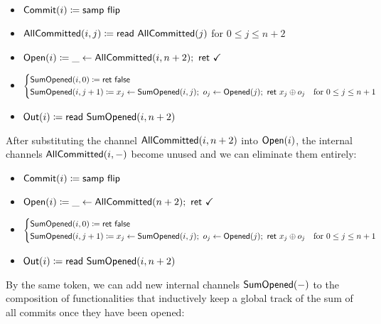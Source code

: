 \begin{itemize}
\item {\color{blue} $\mathsf{Commit}(i) \coloneqq \mathsf{samp} \ \mathsf{flip}$}
\item {\color{magenta} $\mathsf{AllCommitted}(i,j) \coloneqq \mathsf{read} \ \mathsf{AllCommitted}(j)$ for $0 \leq j \leq n+2$}
\item {\color{teal} $\Open(i) \coloneqq \_ \leftarrow \AllCommitted(i,n+2); \ \ret{\checkmark}$}
\item {\color{red} $\begin{cases*} \SumOpened(i,0) \coloneqq \ret{\false} & \\ \SumOpened(i,j+1) \coloneqq x_j \leftarrow \SumOpened(i,j); \ o_j \leftarrow \Opened(j); \ \ret{x_j \oplus o_j} & \text{for $0 \leq j \leq n+1$} \end{cases*}$}
\item $\mathsf{Out}(i) \coloneqq \mathsf{read} \ \mathsf{SumOpened}(i,n+2)$
\end{itemize}

\noindent After substituting the channel $\mathsf{AllCommitted}(i,n+2)$ into $\mathsf{Open}(i)$, the internal channels $\mathsf{AllCommitted}(i,-)$ become unused and we can eliminate them entirely:

\begin{itemize}
\item {\color{blue} $\mathsf{Commit}(i) \coloneqq \mathsf{samp} \ \mathsf{flip}$}
\item {\color{teal} $\Open(i) \coloneqq \_ \leftarrow \AllCommitted(n+2); \ \ret{\checkmark}$}
\item {\color{red} $\begin{cases*} \SumOpened(i,0) \coloneqq \ret{\false} & \\ \SumOpened(i,j+1) \coloneqq x_j \leftarrow \SumOpened(i,j); \ o_j \leftarrow \Opened(j); \ \ret{x_j \oplus o_j} & \text{for $0 \leq j \leq n+1$} \end{cases*}$}
\item $\mathsf{Out}(i) \coloneqq \mathsf{read} \ \mathsf{SumOpened}(i,n+2)$
\end{itemize}

\noindent By the same token, we can add new internal channels $\mathsf{SumOpened}(-)$ to the composition of functionalities that inductively keep a global track of the sum of all commits once they have been opened:

